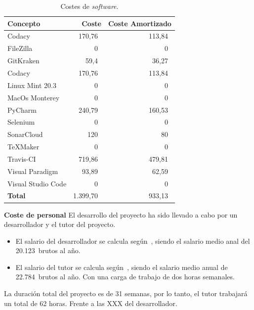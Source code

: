 \begin{table}[H]
\centering
\begin{tabular}{lrr}
	\toprule
	\textbf{Concepto} & \textbf{Coste} & \textbf{Coste Amortizado}\\
	\midrule
	Codacy & 170,76~\officialeuro & 113,84~\officialeuro \\
	FileZilla & 0~\officialeuro & 0~\officialeuro \\
	GitKraken & 59,4~\officialeuro & 36,27~\officialeuro \\
	Codacy & 170,76~\officialeuro & 113,84~\officialeuro \\
	Linux Mint 20.3 & 0~\officialeuro & 0~\officialeuro \\
	MacOs Monterey & 0~\officialeuro & 0~\officialeuro \\
	PyCharm & 240,79~\officialeuro & 160,53~\officialeuro \\
	Selenium & 0~\officialeuro & 0~\officialeuro \\
	SonarCloud & 120~\officialeuro & 80~\officialeuro \\
	\TeX Maker & 0~\officialeuro & 0~\officialeuro \\
	Travis-CI & 719,86~\officialeuro & 479,81~\officialeuro \\
	Visual Paradigm & 93,89~\officialeuro & 62,59~\officialeuro \\
	Visual Studio Code & 0~\officialeuro & 0~\officialeuro \\
	\midrule
	\textbf{Total} & 1.399,70~\officialeuro & 933,13~\officialeuro \\
	\bottomrule
\end{tabular}
\caption{Costes de \emph{software}.}\label{tab:costes-software}
\end{table}

\textbf{Coste de personal}
El desarrollo del proyecto ha sido llevado a cabo por un desarrollador y el tutor del proyecto.
\begin{itemize}
\item El salario del desarrollador se calcula según~\cite{SalarioJunior}, siendo el salario medio anal del 20.123~\officialeuro brutos al año.
\item El salario del tutor se calcula según~\cite{SalarioInvestigador}, siendo el salario medio anual de 22.784~\officialeuro brutos al año. Con una carga de trabajo de dos horas semanales.
\end{itemize}

La duración total del proyecto es de 31 semanas, por lo tanto, el tutor trabajará un total de 62 horas. Frente a las XXX del desarrollador.


